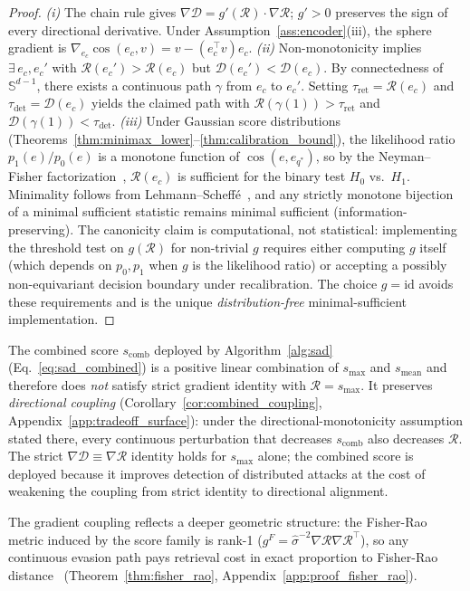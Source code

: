 \documentclass{article}
\theoremstyle{definition}
\newcommand{\cR}{\mathcal{R}}
\newcommand{\cD}{\mathcal{D}}
\DeclareMathOperator{\cosim}{cos}
\begin{document}
\begin{proof}
\emph{(i)} The chain rule gives $\nabla \cD = g'(\cR) \cdot \nabla \cR$; $g' > 0$ preserves the sign of every directional derivative. Under Assumption~\ref{ass:encoder}(iii), the sphere gradient is $\nabla_{e_c}\cosim(e_c, v) = v - (e_c^\top v)e_c$.
\emph{(ii)} Non-monotonicity implies $\exists\, e_c, e_c'$ with $\cR(e_c') > \cR(e_c)$ but $\cD(e_c') < \cD(e_c)$. By connectedness of $\mathbb{S}^{d-1}$, there exists a continuous path $\gamma$ from $e_c$ to $e_c'$. Setting $\tau_{\text{ret}} = \cR(e_c)$ and $\tau_{\text{det}} = \cD(e_c)$ yields the claimed path with $\cR(\gamma(1)) > \tau_{\text{ret}}$ and $\cD(\gamma(1)) < \tau_{\text{det}}$.
\emph{(iii)} Under Gaussian score distributions (Theorems~\ref{thm:minimax_lower}--\ref{thm:calibration_bound}), the likelihood ratio $p_1(e)/p_0(e)$ is a monotone function of $\cosim(e, e_{q^*})$, so by the Neyman--Fisher factorization~\citep{lehmann1959testing}, $\cR(e_c)$ is sufficient for the binary test $H_0$ vs.\ $H_1$. Minimality follows from Lehmann--Scheff\'{e}~\citep{lehmann1959testing}, and any strictly monotone bijection of a minimal sufficient statistic remains minimal sufficient (information-preserving). The canonicity claim is computational, not statistical: implementing the threshold test on $g(\cR)$ for non-trivial $g$ requires either computing $g$ itself (which depends on $p_0, p_1$ when $g$ is the likelihood ratio) or accepting a possibly non-equivariant decision boundary under recalibration. The choice $g = \mathrm{id}$ avoids these requirements and is the unique \emph{distribution-free} minimal-sufficient implementation.
\end{proof}

The combined score $s_{\text{comb}}$ deployed by Algorithm~\ref{alg:sad} (Eq.~\ref{eq:sad_combined}) is a positive linear combination of $s_{\max}$ and $s_{\mathrm{mean}}$ and therefore does \emph{not} satisfy strict gradient identity with $\cR = s_{\max}$. It preserves \emph{directional coupling} (Corollary~\ref{cor:combined_coupling}, Appendix~\ref{app:tradeoff_surface}): under the directional-monotonicity assumption stated there, every continuous perturbation that decreases $s_{\text{comb}}$ also decreases $\cR$. The strict $\nabla \cD \equiv \nabla \cR$ identity holds for $s_{\max}$ alone; the combined score is deployed because it improves detection of distributed attacks at the cost of weakening the coupling from strict identity to directional alignment.

The gradient coupling reflects a deeper geometric structure: the Fisher-Rao metric induced by the score family is rank-1 ($g^F = \hat{\sigma}^{-2}\nabla\cR\nabla\cR^\top$), so any continuous evasion path pays retrieval cost in exact proportion to Fisher-Rao distance~\citep{amari2016information} (Theorem~\ref{thm:fisher_rao}, Appendix~\ref{app:proof_fisher_rao}).
\end{document}
